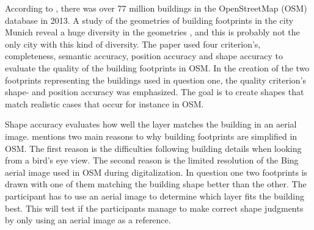According to \cite{Fan2014}, there was over 77 million buildings in the OpenStreetMap (OSM) database in 2013. A study of the geometries of building footprints in the city Munich reveal a huge diversity in the geometries \citep{Fan2014}, and this is probably not the only city with this kind of diversity. The \cite{Fan2014} paper used four criterion's, completeness, semantic accuracy, position accuracy and shape accuracy to evaluate the quality of the building footprints in OSM. In the creation of the two footprints representing the buildings used in question one, the quality criterion's shape- and position accuracy was emphasized. The goal is to create shapes that match realistic cases that occur for instance in OSM. 



Shape accuracy evaluates how well the layer matches the building in an aerial image. \cite{Fan2014} mentions two main reasons to why building footprints are simplified in OSM. The first reason is the difficulties following building details when looking from a bird's eye view. The second reason is the limited resolution of the Bing aerial image used in OSM during digitalization. In question one two footprints is drawn with one of them matching the building shape better than the other. The participant has to use an aerial image to determine which layer fits the building best. This will test if the participants manage to make correct shape judgments by only using an aerial image as a reference. 

